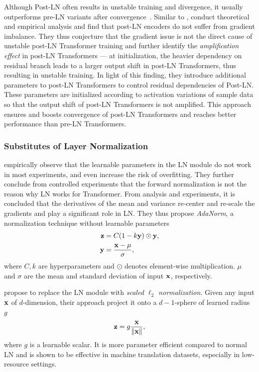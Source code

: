\documentclass[manuscript,acmsmall,screen,nonacm]{acmart}
\theoremstyle{definition}
\begin{document}
Although Post-LN often results in unstable training and divergence, it usually outperforms pre-LN variants after convergence~\cite{liu20understanding}. Similar to \citet{xiong2020layer}, \citet{liu20understanding} conduct theoretical and empirical analysis and find that post-LN encoders do not suffer from gradient imbalance. They thus conjecture that the gradient issue is not the direct cause of unstable post-LN Transformer training and further identify the \textit{amplification effect} in post-LN Transformers — at initialization, the heavier dependency on residual branch leads to a larger output shift in post-LN Transformers, thus resulting in unstable training. In light of this finding, they introduce additional parameters to post-LN Transformers to control residual dependencies of Post-LN. These parameters are initialized according to activation variations of sample data so that the output shift of post-LN Transformers is not amplified. This approach ensures and boosts convergence of post-LN Transformers and reaches better performance than pre-LN Transformers.

\subsubsection{Substitutes of Layer Normalization}

\citet{xu19understanding} empirically observe that the learnable parameters in the LN module do not work in most experiments, and even increase the risk of overfitting. They further conclude from controlled experiments that the forward normalization is not the reason why LN works for Transformer. From analysis and experiments, it is concluded that the derivatives of the mean and variance re-center and re-scale the gradients and play a significant role in LN. They thus propose \textit{AdaNorm}, a normalization technique without learnable parameters
\begin{align}
    \mathbf{z} &= C(1-k\mathbf{y})\odot\mathbf{y},\\
    \mathbf{y} &=\frac{\mathbf{x}-\mu}{\sigma},
\end{align}
where $C,k$ are hyperparameters and $\odot$ denotes element-wise multiplication. $\mu$ and $\sigma$ are the mean and standard deviation of input $\mathbf{x}$, respectively.

\citet{nguyen19xformerwotears} propose to replace the LN module with \textit{scaled $\ell_2$ normalization}. Given any input $\mathbf{x}$ of $d$-dimension, their approach project it onto a $d-1$-sphere of learned radius $g$
\begin{equation}
    \mathbf{z}=g\frac{\mathbf{x}}{\|\mathbf{x}\|},
\end{equation}
where $g$ is a learnable  scalar. It is more parameter efficient compared to normal LN and is shown to be effective in machine translation datasets, especially in low-resource settings.
\end{document}
